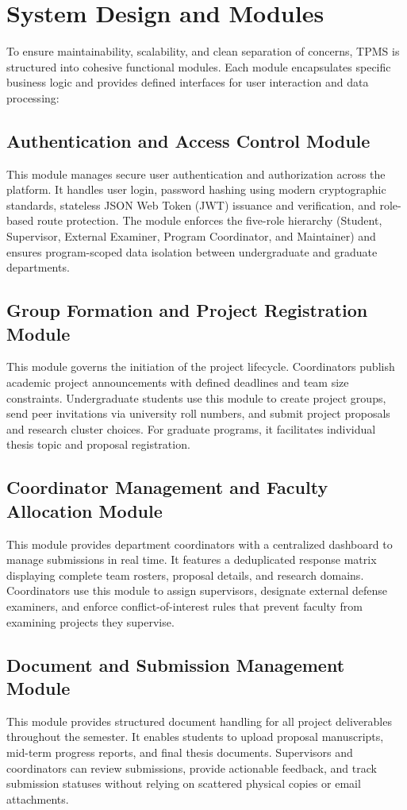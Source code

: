 \documentclass[12pt,a4paper]{report}
\begin{document}
\section{System Design and Modules}
To ensure maintainability, scalability, and clean separation of concerns, TPMS is structured into cohesive functional modules. Each module encapsulates specific business logic and provides defined interfaces for user interaction and data processing:

\subsection{Authentication and Access Control Module}
This module manages secure user authentication and authorization across the platform. It handles user login, password hashing using modern cryptographic standards, stateless JSON Web Token (JWT) issuance and verification, and role-based route protection. The module enforces the five-role hierarchy (Student, Supervisor, External Examiner, Program Coordinator, and Maintainer) and ensures program-scoped data isolation between undergraduate and graduate departments.

\subsection{Group Formation and Project Registration Module}
This module governs the initiation of the project lifecycle. Coordinators publish academic project announcements with defined deadlines and team size constraints. Undergraduate students use this module to create project groups, send peer invitations via university roll numbers, and submit project proposals and research cluster choices. For graduate programs, it facilitates individual thesis topic and proposal registration.

\subsection{Coordinator Management and Faculty Allocation Module}
This module provides department coordinators with a centralized dashboard to manage submissions in real time. It features a deduplicated response matrix displaying complete team rosters, proposal details, and research domains. Coordinators use this module to assign supervisors, designate external defense examiners, and enforce conflict-of-interest rules that prevent faculty from examining projects they supervise.

\subsection{Document and Submission Management Module}
This module provides structured document handling for all project deliverables throughout the semester. It enables students to upload proposal manuscripts, mid-term progress reports, and final thesis documents. Supervisors and coordinators can review submissions, provide actionable feedback, and track submission statuses without relying on scattered physical copies or email attachments.
\end{document}
